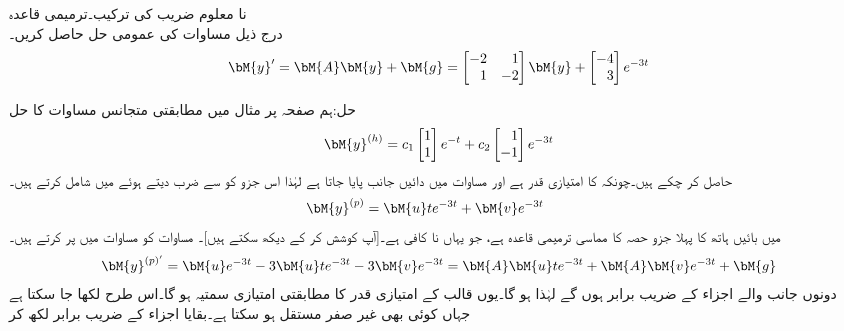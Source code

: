 \quad نا معلوم  ضریب  کی ترکیب۔ترمیمی قاعدہ\\
درج ذیل مساوات کی عمومی حل حاصل کریں۔
\begin{align}\label{مساوات_مثال_غیر_متجانس_نا_معلوم_سر_الف}
\bM{y}'=\bM{A}\bM{y}+\bM{g}=\begin{bmatrix*}[r] -2&1\\1&-2 \end{bmatrix*} \bM{y}+\begin{bmatrix*}[r] -4\\3 \end{bmatrix*} e^{-3t}
\end{align}

حل:ہم صفحہ  پر مثال  میں مطابقتی متجانس مساوات کا حل 
\begin{align}\label{مساوات_مثال_غیر_متجانس_نا_معلوم_سر_ب}
\bM{y}^{(h)}=c_1\begin{bmatrix} 1 \\ 1 \end{bmatrix}e^{-t}+c_2\begin{bmatrix*}[r] 1\\ -1 \end{bmatrix*}e^{-3t}
\end{align}
حاصل کر چکے ہیں۔چونکہ  کا   امتیازی قدر ہے اور مساوات  میں دائیں جانب  پایا جاتا ہے لہٰذا  اس جزو کو  سے ضرب دیتے ہوئے  میں شامل کرتے ہیں۔
\begin{align}\label{مساوات_مثال_غیر_متجانس_نا_معلوم_سر_پ}
\bM{y}^{(p)}=\bM{u}te^{-3t}+\bM{v}e^{-3t} \quad \quad 
\end{align} 
 میں بائیں ہاتھ کا پہلا جزو حصہ  کا مماسی  ترمیمی قاعدہ ہے، جو یہاں نا کافی ہے۔[آپ کوشش کر کے دیکھ سکتے ہیں]۔ مساوات  کو مساوات  میں پر کرتے ہیں۔
\begin{align*}
\bM{y}^{(p)'}=\bM{u}e^{-3t}-3\bM{u}te^{-3t}-3\bM{v}e^{-3t}=\bM{A}\bM{u}te^{-3t}+\bM{A}\bM{v}e^{-3t}+\bM{g}
\end{align*}
دونوں جانب  والے اجزاء کے  ضریب  برابر ہوں گے لہٰذا  ہو گا۔یوں  قالب کے امتیازی قدر  کا مطابقتی امتیازی سمتیہ  ہو گا۔اس طرح  لکھا جا سکتا ہے جہاں  کوئی بھی غیر صفر مستقل ہو سکتا ہے۔بقایا اجزاء کے  ضریب  برابر لکھ کر
